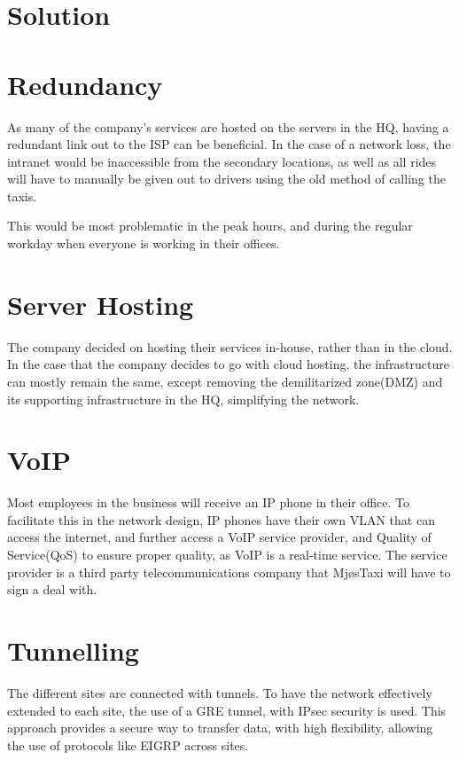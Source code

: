 \section{Solution}



\section{Redundancy}
As many of the company's services are hosted on the servers in the HQ, having a redundant link out to the ISP can be beneficial.
In the case of a network loss, the intranet would be inaccessible from the secondary locations, as well as all rides will have to manually be given out to drivers using the old method of calling the taxis.

This would be most problematic in the peak hours, and during the regular workday when everyone is working in their offices.

\section{Server Hosting}
The company decided on hosting their services in-house, rather than in the cloud.
In the case that the company decides to go with cloud hosting, the infrastructure can mostly remain the same, except removing the demilitarized zone(DMZ) and its supporting infrastructure in the HQ, simplifying the network.



\section{VoIP}
Most employees in the business will receive an IP phone in their office.
To facilitate this in the network design, IP phones have their own VLAN that can access the internet, and further access a VoIP service provider, and Quality of Service(QoS) to ensure proper quality, as VoIP is a real-time service. 
The service provider is a third party telecommunications company that MjøsTaxi will have to sign a deal with.

\section{Tunnelling}
The different sites are connected with tunnels.
To have the network effectively extended to each site, the use of a GRE tunnel, with IPsec security is used.
This approach provides a secure way to transfer data, with high flexibility, allowing the use of protocols like EIGRP across sites.